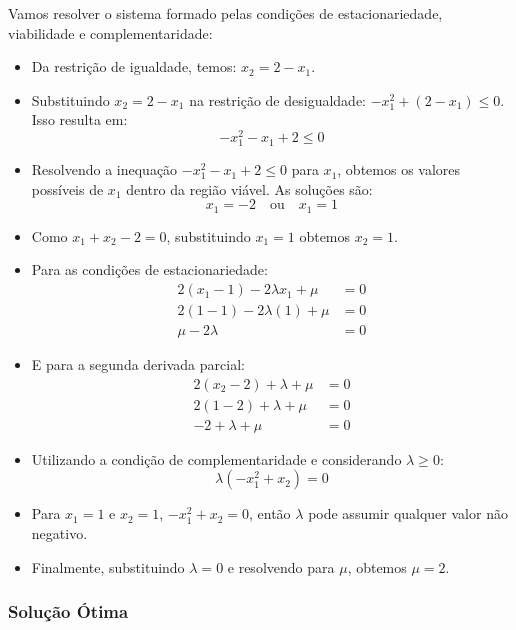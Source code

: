 \documentclass[a4paper, 12pt]{article}
\begin{document}
Vamos resolver o sistema formado pelas condições de estacionariedade, viabilidade e complementaridade:

\begin{itemize}
    \item Da restrição de igualdade, temos: $x_2 = 2 - x_1$.
    \item Substituindo $x_2 = 2 - x_1$ na restrição de desigualdade: $-x_1^2 + (2 - x_1) \leq 0$. Isso resulta em:
    \begin{equation*}
        -x_1^2 - x_1 + 2 \leq 0
    \end{equation*}
    \item Resolvendo a inequação $-x_1^2 - x_1 + 2 \leq 0$ para $x_1$, obtemos os valores possíveis de $x_1$ dentro da região viável. As soluções são:
    \begin{equation*}
        x_1 = -2 \quad \text{ou} \quad x_1 = 1
    \end{equation*}
    \item Como $x_1 + x_2 - 2 = 0$, substituindo $x_1 = 1$ obtemos $x_2 = 1$.
    \item Para as condições de estacionariedade:
    \begin{align*}
        2(x_1 - 1) - 2\lambda x_1 + \mu &= 0 \\
        2(1 - 1) - 2\lambda (1) + \mu &= 0 \\
        \mu - 2\lambda &= 0
    \end{align*}
    \item E para a segunda derivada parcial:
    \begin{align*}
        2(x_2 - 2) + \lambda + \mu &= 0 \\
        2(1 - 2) + \lambda + \mu &= 0 \\
        -2 + \lambda + \mu &= 0
    \end{align*}
    \item Utilizando a condição de complementaridade e considerando $\lambda \geq 0$:
    \begin{equation*}
        \lambda (-x_1^2 + x_2) = 0
    \end{equation*}
    \item Para $x_1 = 1$ e $x_2 = 1$, $-x_1^2 + x_2 = 0$, então $\lambda$ pode assumir qualquer valor não negativo.
    \item Finalmente, substituindo $\lambda = 0$ e resolvendo para $\mu$, obtemos $\mu = 2$.
\end{itemize}

\subsubsection{Solução Ótima}
\end{document}
